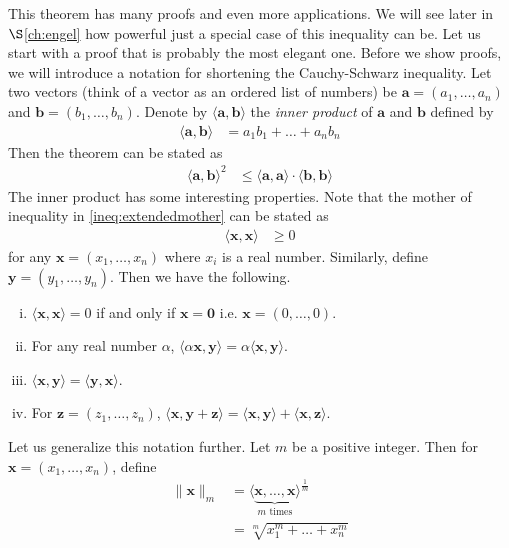 \documentclass{subfile}
\begin{document}
	This theorem has many proofs and even more applications. We will see later in \hyperref[ch:engel]{$\S$\ref{ch:engel}} how powerful just a special case of this inequality can be. Let us start with a proof that is probably the most elegant one. Before we show proofs, we will introduce a notation for shortening the Cauchy-Schwarz inequality. Let two vectors (think of a vector as an ordered list of numbers) be $\mathbf{a}=(a_1,\ldots,a_n)$ and $\mathbf{b}=(b_1,\ldots,b_n)$. Denote by $\langle \mathbf{a},\mathbf{b}\rangle$ the \emph{inner product} of $\mathbf{a}$ and $\mathbf{b}$ defined by
		\begin{align*}
			\langle \mathbf{a},\mathbf{b}\rangle
				& = a_1b_1+\ldots+a_nb_n
		\end{align*}
	Then the theorem can be stated as
		\begin{align*}
			\langle \mathbf{a},\mathbf{b}\rangle^2
				& \leq\langle\mathbf{a},\mathbf{a}\rangle\cdot\langle\mathbf{b},\mathbf{b}\rangle
		\end{align*}
	The inner product has some interesting properties. Note that the mother of inequality in \ref{ineq:extendedmother} can be  stated as
		\begin{align*}
			\langle\mathbf{x},\mathbf{x}\rangle
				& \geq0
		\end{align*}
	for any $\mathbf{x}=(x_1,\ldots,x_n)$ where $x_i$ is a real number. Similarly, define $\mathbf{y}=(y_1,\ldots,y_n)$. Then we have the following.
		\begin{enumerate}[(i)]\label{list:innerprops}
			\item $\langle\mathbf{x},\mathbf{x}\rangle=0$ if and only if $\mathbf{x}=\mathbf{0}$ i.e. $\mathbf{x}=(0,\ldots,0)$.
			\item For any real number $\alpha$, $\langle\alpha\mathbf{x},\mathbf{y}\rangle=\alpha\langle\mathbf{x},\mathbf{y}\rangle$.
			\item $\langle\mathbf{x},\mathbf{y}\rangle=\langle\mathbf{y},\mathbf{x}\rangle$.
			\item For $\mathbf{z}=(z_1,\ldots,z_n)$, $\langle\mathbf{x},\mathbf{y}+\mathbf{z}\rangle=\langle\mathbf{x},\mathbf{y}\rangle+\langle\mathbf{x},\mathbf{z}\rangle$.
		\end{enumerate}
	Let us generalize this notation further. Let $m$ be a positive integer. Then for $\mathbf{x}=(x_1,\ldots,x_n)$, define
		\begin{align*}
			\| \mathbf{x}\| _m
				& = \langle\underbrace{\mathbf{x},\ldots,\mathbf{x}}_{m\mbox{ times}}\rangle^{\frac{1}{m}}\\
				& = \sqrt[m]{x_1^m+\ldots+x_n^m}
		\end{align*}
\end{document}
